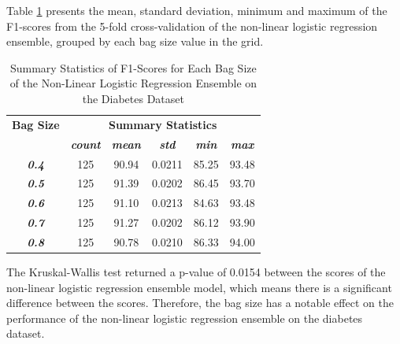 \documentclass[10pt, conference]{IEEEtran}
\begin{document}
Table \ref{table: D_bagsize_nonlinear_performance_metrics} presents the mean, standard deviation, minimum and maximum of the
F1-scores from the 5-fold cross-validation of the non-linear logistic regression ensemble, grouped by each bag size
value in the grid.
\begin{table}[H]
    \caption{Summary Statistics of F1-Scores for Each Bag Size of the Non-Linear Logistic Regression Ensemble on the Diabetes Dataset}
    \begin{center}
        \begin{tabular}{|c||c|c|c|c|c|}
            \hline
            \textbf{Bag Size}&\multicolumn{5}{|c|}{\textbf{Summary Statistics}} \\
            \cline{2-6}
                                &\textbf{\textit{count}} & \textbf{\textit{mean}} & \textbf{\textit{std}} & \textbf{\textit{min}} & \textbf{\textit{max}}\\
            \hline
            \textbf{\textit{0.4}} & 125 & 90.94 & 0.0211 & 85.25 & 93.48 \\
            \textbf{\textit{0.5}} & 125 & 91.39 & 0.0202 & 86.45 & 93.70 \\
            \textbf{\textit{0.6}} & 125 & 91.10 & 0.0213 & 84.63 & 93.48 \\
            \textbf{\textit{0.7}} & 125 & 91.27 & 0.0202 & 86.12 & 93.90 \\
            \textbf{\textit{0.8}} & 125 & 90.78 & 0.0210 & 86.33 & 94.00 \\
            \hline
        \end{tabular}
    \end{center}
    \label{table: D_bagsize_nonlinear_performance_metrics}
\end{table}
The Kruskal-Wallis test returned a p-value of 0.0154 between the scores of the non-linear logistic regression ensemble model,
which means there is a significant difference between the scores. Therefore, the bag size has a notable effect on the
performance of the non-linear logistic regression ensemble on the diabetes dataset.
\end{document}
